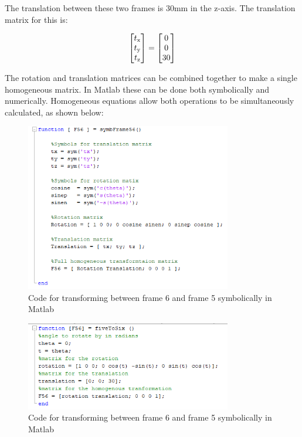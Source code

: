 \documentclass [11pt]{report}
\begin{document}
The translation between these two frames is 30mm in the z-axis. The translation matrix for this is:

\begin{equation*}
\begin{bmatrix}
t\textsubscript{x}\\
t\textsubscript{y}\\
t\textsubscript{z}\\
\end{bmatrix}
=
\begin{bmatrix}
0\\
0\\
30\\
\end{bmatrix}
\end{equation*}

The rotation and translation matrices can be combined together to make a single homogeneous matrix. In Matlab these can be done both symbolically and numerically. Homogeneous equations allow both operations to be simultaneously calculated, as shown below:

\begin{figure}[H]
\centerline{\includegraphics[width=9cm]{symbFrame56.png}}
\caption{Code for transforming between frame 6 and frame 5 symbolically in Matlab}
\label{fig}
\end{figure}


\begin{figure}[H]
\centerline{\includegraphics[width=9cm]{fiveToSixcode.png}}
\caption{Code for transforming between frame 6 and frame 5 symbolically in Matlab}
\label{fig}
\end{figure}
\end{document}
